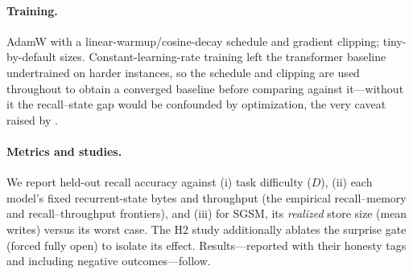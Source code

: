 \paragraph{Training.} AdamW with a linear-warmup/cosine-decay schedule and gradient clipping;
tiny-by-default sizes. Constant-learning-rate training left the transformer baseline undertrained
on harder instances, so the schedule and clipping are used throughout to obtain a converged
baseline before comparing against it---without it the recall--state gap would be confounded by
optimization, the very caveat raised by \citet{okpekpe2025revisiting}.

\paragraph{Metrics and studies.} We report held-out recall accuracy against (i) task difficulty
($D$), (ii) each model's fixed recurrent-state bytes and throughput (the empirical recall--memory
and recall--throughput frontiers), and (iii) for SGSM, its \emph{realized} store size (mean writes)
versus its worst case. The H2 study additionally ablates the surprise gate (forced fully open) to
isolate its effect. Results---reported with their honesty tags and including negative
outcomes---follow.
